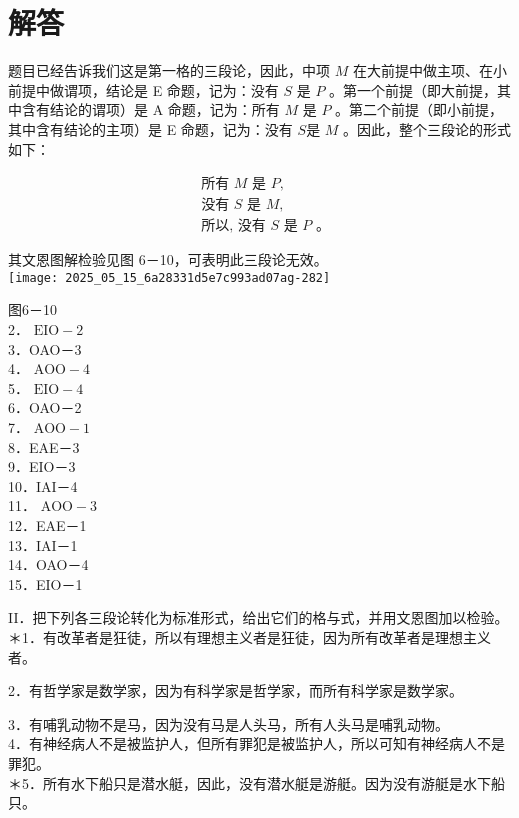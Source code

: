\section*{解答}
题目已经告诉我们这是第一格的三段论，因此，中项 $M$ 在大前提中做主项、在小前提中做谓项，结论是 E 命题，记为：没有 $S$ 是 $P$ 。第一个前提（即大前提，其中含有结论的谓项）是 A 命题，记为：所有 $M$ 是 $P$ 。第二个前提（即小前提，其中含有结论的主项）是 E 命题，记为：没有 $S$是 $M$ 。因此，整个三段论的形式如下：

$$
\begin{aligned}
& \text { 所有 } M \text { 是 } P, \\
& \text { 没有 } S \text { 是 } M, \\
& \text { 所以, 没有 } S \text { 是 } P \text { 。 }
\end{aligned}
$$

其文恩图解检验见图 6－10，可表明此三段论无效。\\
\texttt{[image: 2025\_05\_15\_6a28331d5e7c993ad07ag-282]}

图6－10\\
2． $\mathrm{EIO}-2$\\
3．OAO－3\\
4． $\mathrm{AOO}-4$\\
5． $\mathrm{EIO}-4$\\
6．OAO－2\\
7． $\mathrm{AOO}-1$\\
8．EAE－3\\
9．EIO－3\\
10．IAI－4\\
11． $\mathrm{AOO}-3$\\
12．EAE－1\\
13．IAI－1\\
14．OAO－4\\
15．EIO－1

II．把下列各三段论转化为标准形式，给出它们的格与式，并用文恩图加以检验。\\
＊1．有改革者是狂徒，所以有理想主义者是狂徒，因为所有改革者是理想主义者。

2．有哲学家是数学家，因为有科学家是哲学家，而所有科学家是数学家。

3．有哺乳动物不是马，因为没有马是人头马，所有人头马是哺乳动物。\\
4．有神经病人不是被监护人，但所有罪犯是被监护人，所以可知有神经病人不是罪犯。\\
＊5．所有水下船只是潜水艇，因此，没有潜水艇是游艇。因为没有游艇是水下船只。

